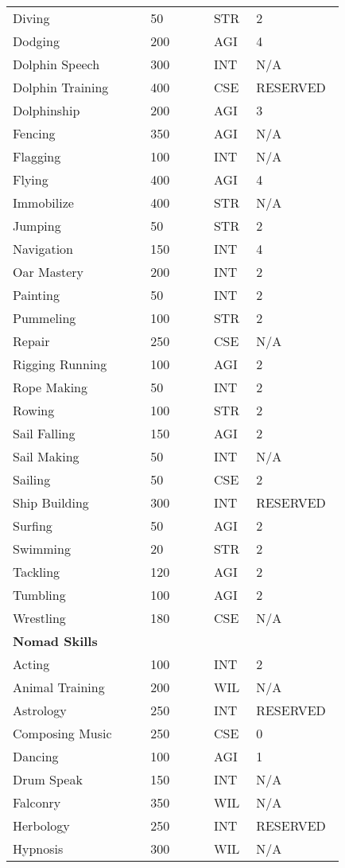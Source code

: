 \documentclass{article}
\begin{document}
\begin{longtable}{@{}p{0.375\linewidth} p{0.178\linewidth} p{0.1\linewidth} p{0.178\linewidth}}
Diving & 50 & STR & 2 \\
Dodging & 200 & AGI & 4 \\
Dolphin Speech & 300 & INT & N/A \\
Dolphin Training & 400 & CSE & RESERVED \\
Dolphinship & 200 & AGI & 3 \\
Fencing & 350 & AGI & N/A \\
Flagging & 100 & INT & N/A \\
Flying & 400 & AGI & 4 \\
Immobilize & 400 & STR & N/A \\
Jumping & 50 & STR & 2 \\
Navigation & 150 & INT & 4 \\
Oar Mastery & 200 & INT & 2 \\
Painting & 50 & INT & 2 \\
Pummeling & 100 & STR & 2 \\
Repair & 250 & CSE & N/A \\
Rigging Running & 100 & AGI & 2 \\
Rope Making & 50 & INT & 2 \\
Rowing & 100 & STR & 2 \\
Sail Falling & 150 & AGI & 2 \\
Sail Making & 50 & INT & N/A \\
Sailing & 50 & CSE & 2 \\
Ship Building & 300 & INT & RESERVED \\
Surfing & 50 & AGI & 2 \\
Swimming & 20 & STR & 2 \\
Tackling & 120 & AGI & 2 \\
Tumbling & 100 & AGI & 2 \\
Wrestling & 180 & CSE & N/A \\
\midrule
\textbf{Nomad Skills} &  & & \\
Acting & 100 & INT & 2 \\
Animal Training & 200 & WIL & N/A \\
Astrology & 250 & INT & RESERVED \\
Composing Music & 250 & CSE & 0 \\
Dancing & 100 & AGI & 1 \\
Drum Speak & 150 & INT & N/A \\
Falconry & 350 & WIL & N/A \\
Herbology & 250 & INT & RESERVED \\
Hypnosis & 300 & WIL & N/A \\

\end{longtable}
\end{document}
